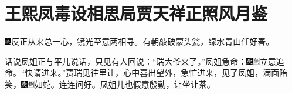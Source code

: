 

\chapter{王熙凤毒设相思局\hspace{.5em}贾天祥正照风月鉴}

{\includegraphics[width=3mm]{../Images/00005}反正从来总一心，镜光至意两相寻。有朝敲破蒙头瓮，绿水青山任好春。}

话说凤姐正与平儿说话，只见有人回说：``瑞大爷来了。''凤姐急命：{\includegraphics[width=3mm]{../Images/00004}\includegraphics[width=3mm]{../Images/00011}\footnotesize \kaishu 立意追命。}``快请进来。''贾瑞见往里让，心中喜出望外，急忙进来，见了凤姐，满面陪笑，{\includegraphics[width=3mm]{../Images/00004}\includegraphics[width=3mm]{../Images/00011}\footnotesize \kaishu 如蛇。}连连问好。凤姐儿也假意殷勤，让坐让茶。

